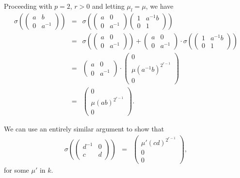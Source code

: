Proceeding with $p=2$, $r>0$ and letting $\mu_l = \mu$, we have
\begin{eqnarray*}
\sigma\left(
	\left(\begin{matrix} a & b \\ 0 & a^{-1}\end{matrix}\right)
\right) &=&
\sigma\left(
	\left(\begin{matrix} a & 0 \\ 0 & a^{-1}\end{matrix}\right)
	\left(\begin{matrix} 1 & a^{-1}b \\ 0 & 1\end{matrix}\right)
\right) \\
&=&
\sigma\left(
	\left(\begin{matrix} a & 0 \\ 0 & a^{-1}\end{matrix}\right)
\right) +
\left(\begin{matrix} a & 0 \\ 0 & a^{-1}\end{matrix}\right) \cdot
\sigma\left(
	\left(\begin{matrix} 1 & a^{-1}b \\ 0 & 1\end{matrix}\right)
\right) \\
&=&
\left(\begin{matrix} a & 0 \\ 0 & a^{-1}\end{matrix}\right) \cdot
\left(\begin{matrix} 0 \\ \mu(a^{-1}b)^{2^{r-1}} \\ 0 \end{matrix}\right) \\
&=&
\left(\begin{matrix} 0 \\ \mu(ab)^{2^{r-1}} \\ 0 \end{matrix}\right).
\end{eqnarray*}

We can use an entirely similar argument to show that
\begin{eqnarray*}
\sigma\left(
	\left(\begin{matrix} d^{-1} & 0 \\ c & d\end{matrix}\right)
\right) &=&
\left(\begin{matrix} \mu'(cd)^{2^{r-1}} \\ 0 \\ 0 \end{matrix}\right),
\end{eqnarray*}
for some $\mu'$ in $k$. 

